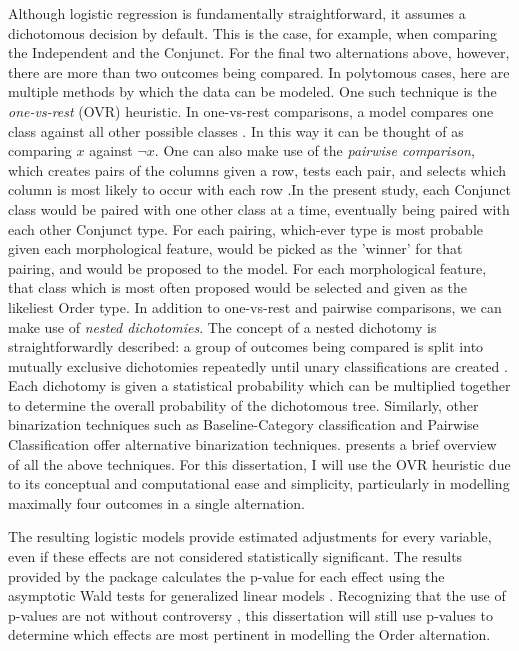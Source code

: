 Although logistic regression is fundamentally straightforward, it assumes a dichotomous decision by default. This is the case, for example, when comparing the Independent and the Conjunct. For the final two alternations above, however, there are more than two outcomes being compared. In polytomous cases, here are multiple methods by which the data can be modeled. One such technique is the \textit{one-vs-rest} (OVR) heuristic. In one-vs-rest comparisons, a model compares one class against all other possible classes \citep{Kramer2004}. In this way it can be thought of as comparing $x$ against $\neg x$. One can also make use of the \textit{pairwise comparison}, which creates pairs of the columns given a row, tests each pair, and selects which column is most likely to occur with each row \citep{Kramer2004}.In the present study, each Conjunct class would be paired with one other class at a time, eventually being paired with each other Conjunct type. For each pairing, which-ever type is most probable given each morphological feature, would be picked as the 'winner' for that pairing, and would be proposed to the model. For each morphological feature, that class which is most often proposed would be selected and given as the likeliest Order type. In addition to one-vs-rest and pairwise comparisons, we can make use of \textit{nested dichotomies}. The concept of a nested dichotomy is straightforwardly described: a group of outcomes being compared is split into mutually exclusive dichotomies repeatedly until unary classifications are created \citep{Kramer2004}. Each dichotomy is given a statistical probability which can be multiplied together to determine the overall probability of the dichotomous tree. Similarly, other binarization techniques such as Baseline-Category \citep[468]{fox1997applied} classification and Pairwise Classification \citep{furnkranz2002pairwise} offer alternative binarization techniques. \citet{arppe2008univariate} presents a brief overview of all the above techniques. For this dissertation, I will use the OVR heuristic due to its conceptual and computational ease and simplicity, particularly in modelling maximally four outcomes in a single alternation.


The resulting logistic models provide estimated adjustments for every variable, even if these effects are not considered statistically significant. The results provided by the  package calculates the p-value for each effect using the asymptotic Wald tests for generalized linear models \citep{lme4}. Recognizing that the use of p-values are not without controversy \citep{gelman2016problems}, this dissertation will still use p-values to determine which effects are most pertinent in modelling the Order alternation.

